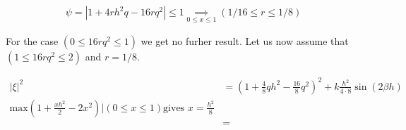 \begin{align*}
\psi = \left| 1+4rh^2q -16rq^2\right| \le 1 \underset{0\le x\le 1}{\implies} \left(1/16 \le r \le 1/8 \right)
\end{align*} 

For the case $(0 \le 16rq^2 \le 1)$ we get no furher result. Let us now assume that $(1 \le 16rq^2 \le 2)$ and $r = 1/8$. 

\begin{align*}
|\xi |^2 &= \left(1 + \frac{4}{8}qh^2 - \frac{16}{8}q^2\right)^2 + k\frac{h^2}{4\cdot 8}\sin(2\beta h) \\
\textrm{max}\left(1 + \frac{xh^2}{2} - 2x^2\right) | (0 \le x \le 1) \textrm{gives } x = \frac{h^2}{8} \\
&= 
\end{align*}






